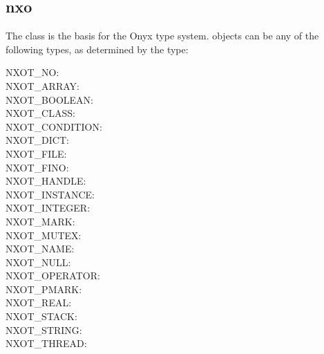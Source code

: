 %
%
%
%
%              

\subsection{nxo}
\label{nxo}

The  class is the basis for the Onyx type system.
 objects can be any of the following types, as determined by the
 type:
\begin{description}
\item[NXOT\_NO: ] 
\item[NXOT\_ARRAY: ] 
\item[NXOT\_BOOLEAN: ] 
\item[NXOT\_CLASS: ] 
\item[NXOT\_CONDITION: ] 
\item[NXOT\_DICT: ] 
\item[NXOT\_FILE: ] 
\item[NXOT\_FINO: ] 
\item[NXOT\_HANDLE: ] 
\item[NXOT\_INSTANCE: ] 
\item[NXOT\_INTEGER: ] 
\item[NXOT\_MARK: ] 
\item[NXOT\_MUTEX: ] 
\item[NXOT\_NAME: ] 
\item[NXOT\_NULL: ] 
\item[NXOT\_OPERATOR: ] 
\item[NXOT\_PMARK: ] 
\item[NXOT\_REAL: ] 
\item[NXOT\_STACK: ] 
\item[NXOT\_STRING: ] 
\item[NXOT\_THREAD: ] 
\end{description}

